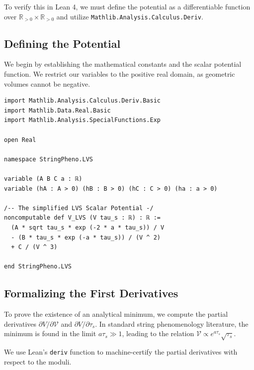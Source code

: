 \documentclass[aps,prd,twocolumn,nofootinbib,superscriptaddress,10pt]{revtex4-2}
\begin{document}
To verify this in Lean 4, we must define the potential as a differentiable function over $\mathbb{R}_{>0} \times \mathbb{R}_{>0}$ and utilize \texttt{Mathlib.Analysis.Calculus.Deriv}.

\subsection{Defining the Potential}
We begin by establishing the mathematical constants and the scalar potential function. We restrict our variables to the positive real domain, as geometric volumes cannot be negative.

\begin{lstlisting}[caption={Lean 4 definitions for the LVS scalar potential parameters and function.}, label={lst:potential}]
import Mathlib.Analysis.Calculus.Deriv.Basic
import Mathlib.Data.Real.Basic
import Mathlib.Analysis.SpecialFunctions.Exp

open Real

namespace StringPheno.LVS

variable (A B C a : ℝ)
variable (hA : A > 0) (hB : B > 0) (hC : C > 0) (ha : a > 0)

/-- The simplified LVS Scalar Potential -/
noncomputable def V_LVS (V tau_s : ℝ) : ℝ :=
  (A * sqrt tau_s * exp (-2 * a * tau_s)) / V 
  - (B * tau_s * exp (-a * tau_s)) / (V ^ 2) 
  + C / (V ^ 3)

end StringPheno.LVS
\end{lstlisting}

\subsection{Formalizing the First Derivatives}
To prove the existence of an analytical minimum, we compute the partial derivatives $\partial V / \partial \mathcal{V}$ and $\partial V / \partial \tau_s$. In standard string phenomenology literature, the minimum is found in the limit $a \tau_s \gg 1$, leading to the relation $\mathcal{V} \propto e^{a \tau_s} \sqrt{\tau_s}$. 

We use Lean's \texttt{deriv} function to machine-certify the partial derivatives with respect to the moduli. 
\end{document}
